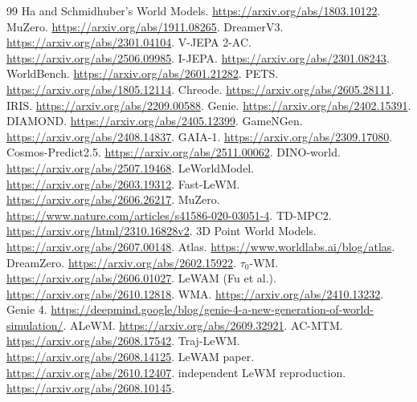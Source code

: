 \IfFileExists{IEEEtran.cls}{\documentclass[journal]{IEEEtran}}{\documentclass[twocolumn]{article}}
\begin{document}
\clearpage
\begin{thebibliography}{99}
 Ha and Schmidhuber's World Models. \url{https://arxiv.org/abs/1803.10122}.
 MuZero. \url{https://arxiv.org/abs/1911.08265}.
 DreamerV3. \url{https://arxiv.org/abs/2301.04104}.
 V-JEPA 2-AC. \url{https://arxiv.org/abs/2506.09985}.
 I-JEPA. \url{https://arxiv.org/abs/2301.08243}.
 WorldBench. \url{https://arxiv.org/abs/2601.21282}.
 PETS. \url{https://arxiv.org/abs/1805.12114}.
 Chreode. \url{https://arxiv.org/abs/2605.28111}.
 IRIS. \url{https://arxiv.org/abs/2209.00588}.
 Genie. \url{https://arxiv.org/abs/2402.15391}.
 DIAMOND. \url{https://arxiv.org/abs/2405.12399}.
 GameNGen. \url{https://arxiv.org/abs/2408.14837}.
 GAIA-1. \url{https://arxiv.org/abs/2309.17080}.
 Cosmos-Predict2.5. \url{https://arxiv.org/abs/2511.00062}.
 DINO-world. \url{https://arxiv.org/abs/2507.19468}.
 LeWorldModel. \url{https://arxiv.org/abs/2603.19312}.
 Fast-LeWM. \url{https://arxiv.org/abs/2606.26217}.
 MuZero. \url{https://www.nature.com/articles/s41586-020-03051-4}.
 TD-MPC2. \url{https://arxiv.org/html/2310.16828v2}.
 3D Point World Models. \url{https://arxiv.org/abs/2607.00148}.
 Atlas. \url{https://www.worldlabs.ai/blog/atlas}.
 DreamZero. \url{https://arxiv.org/abs/2602.15922}.
 $\tau_0$-WM. \url{https://arxiv.org/abs/2606.01027}.
 LeWAM (Fu et al.). \url{https://arxiv.org/abs/2610.12818}.
 WMA. \url{https://arxiv.org/abs/2410.13232}.
 Genie 4. \url{https://deepmind.google/blog/genie-4-a-new-generation-of-world-simulation/}.
 ALeWM. \url{https://arxiv.org/abs/2609.32921}.
 AC-MTM. \url{https://arxiv.org/abs/2608.17542}.
 Traj-LeWM. \url{https://arxiv.org/abs/2608.14125}.
 LeWAM paper. \url{https://arxiv.org/abs/2610.12407}.
 independent LeWM reproduction. \url{https://arxiv.org/abs/2608.10145}.
\end{thebibliography}
\end{document}
